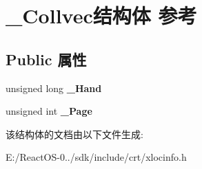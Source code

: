 \hypertarget{struct___collvec}{}\section{\+\_\+\+Collvec结构体 参考}
\label{struct___collvec}
\subsection*{Public 属性}
\begin{DoxyCompactItemize}
\item 
\mbox{\label{struct___collvec_a4f8eabd8c8e58b6d820a25d40193e9de}} 
unsigned long {\bfseries \+\_\+\+Hand}
\item 
\mbox{\label{struct___collvec_a0c7601bc64e2e1e87df16bd658d77434}} 
unsigned int {\bfseries \+\_\+\+Page}
\end{DoxyCompactItemize}


该结构体的文档由以下文件生成\+:\begin{DoxyCompactItemize}
\item 
E\+:/\+React\+O\+S-\/0../sdk/include/crt/xlocinfo.\+h\end{DoxyCompactItemize}
